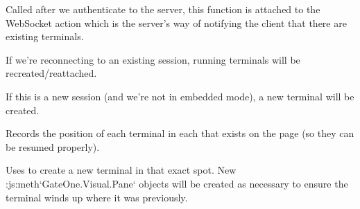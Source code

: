 \documentclass[letterpaper,10pt,openany]{sphinxmanual}
\begin{document}

\begin{fulllineitems}
\label{Applications/terminal/js_terminal:GateOne.Terminal.reattachTerminalsAction}
Called after we authenticate to the server, this function is attached to the  WebSocket action which is the server's way of notifying the client that there are existing terminals.

If we're reconnecting to an existing session, running terminals will be recreated/reattached.

If this is a new session (and we're not in embedded mode), a new terminal will be created.

\end{fulllineitems}


\begin{fulllineitems}
\label{Applications/terminal/js_terminal:GateOne.Terminal.recordPanePositions}
Records the position of each terminal in each  that exists on the page (so they can be resumed properly).

\end{fulllineitems}


\begin{fulllineitems}
\label{Applications/terminal/js_terminal:GateOne.Terminal.resumePanePosition}
Uses  to create a new terminal in that exact spot.  New :js:meth{}`GateOne.Visual.Pane{}` objects will be created as necessary to ensure the terminal winds up where it was previously.

\end{fulllineitems}

\end{document}
